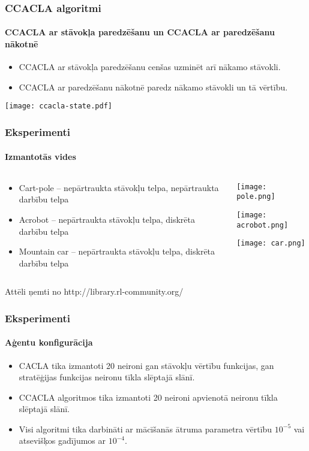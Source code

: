 \documentclass[xetex,mathserif]{beamer}
\begin{document}
  \begin{frame}
    \frametitle{CCACLA algoritmi}
    \framesubtitle{CCACLA ar stāvokļa paredzēšanu un CCACLA ar paredzēšanu nākotnē}
    \begin{itemize}
      \item CCACLA ar stāvokļa paredzēšanu cenšas uzminēt arī nākamo stāvokli.
      \item CCACLA ar paredzēšanu nākotnē paredz nākamo stāvokli un tā vērtību.
    \end{itemize}
    \begin{center}
      \hspace{2cm} \texttt{[image: ccacla-state.pdf]}
    \end{center}
  \end{frame}
  
  \begin{frame}
    \frametitle{Eksperimenti}
    \framesubtitle{Izmantotās vides}
    \begin{columns}[c]
    \begin{column}[c]{5cm}
      \begin{itemize}
        \item Cart-pole -- nepārtraukta stāvokļu telpa, nepārtraukta darbību telpa
        \item Acrobot -- nepārtraukta stāvokļu telpa, diskrēta darbību telpa
        \item Mountain car -- nepārtraukta stāvokļu telpa, diskrēta darbību telpa
      \end{itemize}

    \end{column}
    \begin{column}[c]{5cm}
      \texttt{[image: pole.png]}

      \vspace{1cm}
      \texttt{[image: acrobot.png]}

      \vspace{0.7cm}
      \texttt{[image: car.png]}
    \end{column}
    \end{columns}
      \tiny{Attēli ņemti no http://library.rl-community.org/}
  \end{frame}

  \begin{frame}
    \frametitle{Eksperimenti}
    \framesubtitle{Aģentu konfigurācija}
      \begin{itemize}
        \item CACLA tika izmantoti 20 neironi gan stāvokļu vērtību funkcijas,
          gan stratēģijas funkcijas neironu tīkla slēptajā slānī.
        \item CCACLA algoritmos tika izmantoti 20 neironi apvienotā neironu
          tīkla slēptajā slānī.
        \item Visi algoritmi tika darbināti ar mācīšanās ātruma parametra
          vērtību $10^{-5}$ vai atsevišķos gadījumos ar $10^{-4}$.
      \end{itemize}
  \end{frame}
\end{document}
